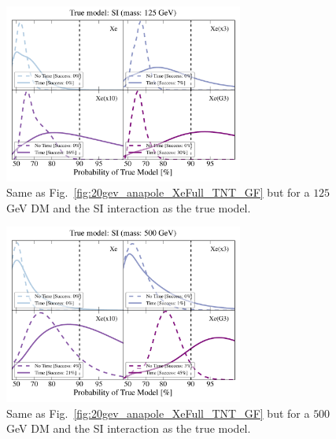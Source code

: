 \documentclass[11pt]{article}
\begin{document}
\begin{figure}
\centering
\includegraphics[width=0.7\textwidth]{plots/PDF_125GeV_SI_Higgs_50sims_Xe_Xe3x_Xe10x_XeG3_GF_TNT.pdf}
\caption{\label{fig:125gev_SI_Higgs_XeFull_TNT_GF}
Same as Fig.~\ref{fig:20gev_anapole_XeFull_TNT_GF} but for a $125$ GeV DM and the SI interaction as the true model.}
\end{figure}


\begin{figure}
\centering
\includegraphics[width=0.7\textwidth]{plots/PDF_500GeV_SI_Higgs_50sims_Xe_Xe3x_Xe10x_XeG3_GF_TNT.pdf}
\caption{\label{fig:500gev_SI_Higgs_XeFull_TNT_GF}
Same as Fig.~\ref{fig:20gev_anapole_XeFull_TNT_GF} but for a $500$ GeV DM and the SI interaction as the true model.}
\end{figure}



\end{document}

